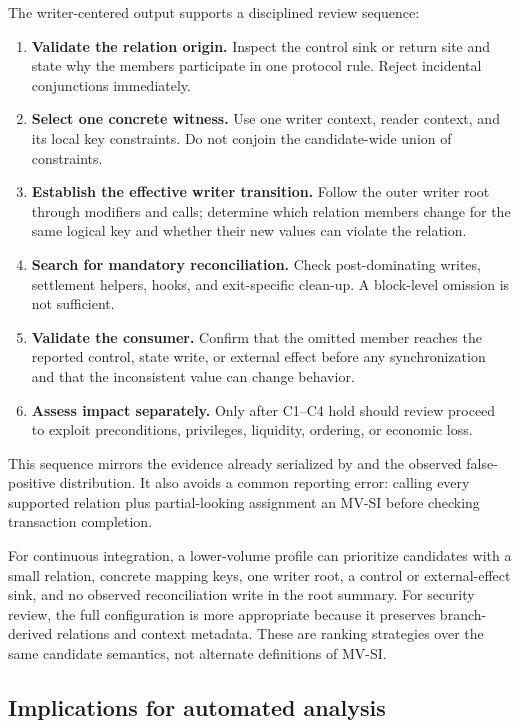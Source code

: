 The writer-centered output supports a disciplined review sequence:
\begin{enumerate}[leftmargin=*,nosep]
  \item \textbf{Validate the relation origin.} Inspect the control sink or return site and state why the members participate in one protocol rule. Reject incidental conjunctions immediately.
  \item \textbf{Select one concrete witness.} Use one writer context, reader context, and its local key constraints. Do not conjoin the candidate-wide union of constraints.
  \item \textbf{Establish the effective writer transition.} Follow the outer writer root through modifiers and calls; determine which relation members change for the same logical key and whether their new values can violate the relation.
  \item \textbf{Search for mandatory reconciliation.} Check post-dominating writes, settlement helpers, hooks, and exit-specific clean-up. A block-level omission is not sufficient.
  \item \textbf{Validate the consumer.} Confirm that the omitted member reaches the reported control, state write, or external effect before any synchronization and that the inconsistent value can change behavior.
  \item \textbf{Assess impact separately.} Only after C1--C4 hold should review proceed to exploit preconditions, privileges, liquidity, ordering, or economic loss.
\end{enumerate}

This sequence mirrors the evidence already serialized by \sys and the observed false-positive distribution. It also avoids a common reporting error: calling every supported relation plus partial-looking assignment an MV-SI before checking transaction completion.

For continuous integration, a lower-volume profile can prioritize candidates with a small relation, concrete mapping keys, one writer root, a control or external-effect sink, and no observed reconciliation write in the root summary. For security review, the full configuration is more appropriate because it preserves branch-derived relations and context metadata. These are ranking strategies over the same candidate semantics, not alternate definitions of MV-SI.

\subsection{Implications for automated analysis}
\label{s:discussion-analysis-implications}

